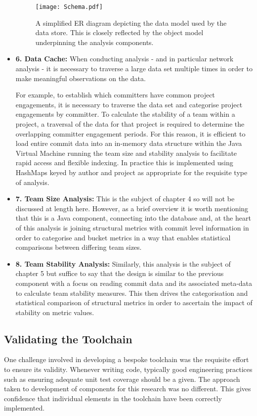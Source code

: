 \begin{itemize}
 \begin{figure}[htbp!] 
 \centering    
 \texttt{[image: Schema.pdf]}
 \caption[A simplified ER diagram depicting the logical data model used by the data store.]{A simplified ER diagram depicting the data model used by the data store. This is closely reflected by the object model underpinning the analysis components.}
 \label{fig:Schema}
 \end{figure}

\item \textbf{6. Data Cache:}
When conducting analysis - and in particular network analysis - it is necessary to traverse a large data set multiple times in order to make meaningful observations on the data.

For example, to establish which committers have common project engagements, it is necessary to traverse the data set and categorise project engagements by committer. To calculate the stability of a team within a project, a traversal of the data for that project is required to determine the overlapping committer engagement periods. For this reason, it is efficient to load entire commit data into an in-memory data structure within the Java Virtual Machine running the team size and stability analysis to facilitate rapid access and flexible indexing. In practice this is implemented using HashMaps keyed by author and project as appropriate for the requisite type of analysis. 

\item \textbf{7. Team Size Analysis:} This is the subject of chapter 4 so will not be discussed at length here. However, as a brief overview it is worth mentioning that this is a Java component, connecting into the database and, at the heart of this analysis is joining structural metrics with commit level information in order to categorise and bucket metrics in a way that enables statistical comparisons between differing team sizes.

\item \textbf{8. Team Stability Analysis:} Similarly, this analysis is the subject of chapter 5 but suffice to say that the design is similar to the previous component with a focus on reading commit data and its associated meta-data to calculate team stability measures. This then drives the categorisation and statistical comparison of structural metrics in order to ascertain the impact of stability on metric values.
\end{itemize}

\subsection{Validating the Toolchain}
One challenge involved in developing a bespoke toolchain was the requisite effort to ensure its validity. Whenever writing code, typically good engineering practices such as ensuring adequate unit test coverage should be a given. The approach taken to development of components for this research was no different. This gives confidence that individual elements in the toolchain have been correctly implemented. 

